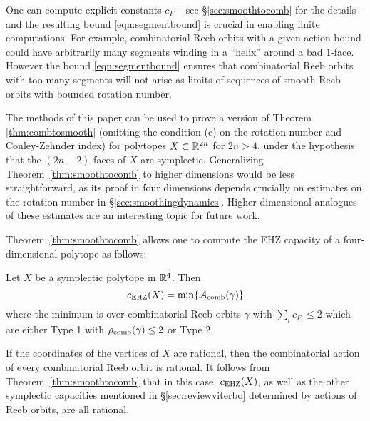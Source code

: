 \begin{remark}
One can compute explicit constants $c_F$ -- see \S\ref{sec:smoothtocomb} for the details -- and the resulting bound \eqref{eqn:segmentbound} is crucial in enabling finite computations. For example, combinatorial Reeb orbits with a given action bound could have arbitrarily many segments winding in a ``helix'' around a bad $1$-face. However the bound \eqref{eqn:segmentbound} ensures that combinatorial Reeb orbits with too many segments will not arise as limits of sequences of smooth Reeb orbits with bounded rotation number.
\end{remark}

\begin{remark}
The methods of this paper can be used to prove a version of Theorem \ref{thm:combtosmooth} (omitting the condition (c) on the rotation number and Conley-Zehnder index) for polytopes $X \subset {\mathbb R}^{2n}$ for $2n > 4$, under the hypothesis that the $(2n-2)$-faces of $X$ are symplectic. Generalizing Theorem~\ref{thm:smoothtocomb} to higher dimensions would be less straightforward, as its proof in four dimensions depends crucially on estimates on the rotation number in \S\ref{sec:smoothingdynamics}. Higher dimensional analogues of these estimates are an interesting topic for future work.
\end{remark}

Theorem~\ref{thm:smoothtocomb} allows one to compute the EHZ capacity of a four-dimensional polytope as follows:

\begin{corollary}
\label{cor:computecehz}
Let $X$ be a symplectic polytope in ${\mathbb R}^4$. Then
\begin{equation}
\label{eqn:corcehz}
c_{\operatorname{EHZ}}(X) = \operatorname{min}\{{\mathcal A}_{\operatorname{comb}}(\gamma)\}
\end{equation}
where the minimum is over combinatorial Reeb orbits $\gamma$ with $\sum_ic_{F_i}\le 2$ which are either Type 1 with $\rho_{\operatorname{comb}}(\gamma)\le 2$ or Type 2.
\end{corollary}

\begin{remark}
If the coordinates of the vertices of $X$ are rational, then the combinatorial action of every combinatorial Reeb orbit is rational. It follows from Theorem~\ref{thm:smoothtocomb} that in this case, $c_{\operatorname{EHZ}}(X)$, as well as the other symplectic capacities mentioned in \S\ref{sec:reviewviterbo} determined by actions of Reeb orbits, are all rational.
\end{remark}

